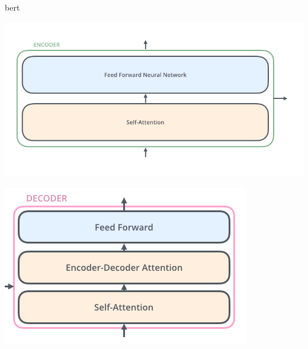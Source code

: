 \begin{frame}{\acf{bert}}
\begin{center}
     \begin{minipage}{.4\textwidth}
      \includegraphics[width=\textwidth]{img/transformer2.png}
     \end{minipage}
     \begin{minipage}{.4\textwidth}
      \includegraphics[width=\textwidth]{img/transformer3.png}
     \end{minipage}
    \end{center}
  \end{frame}


